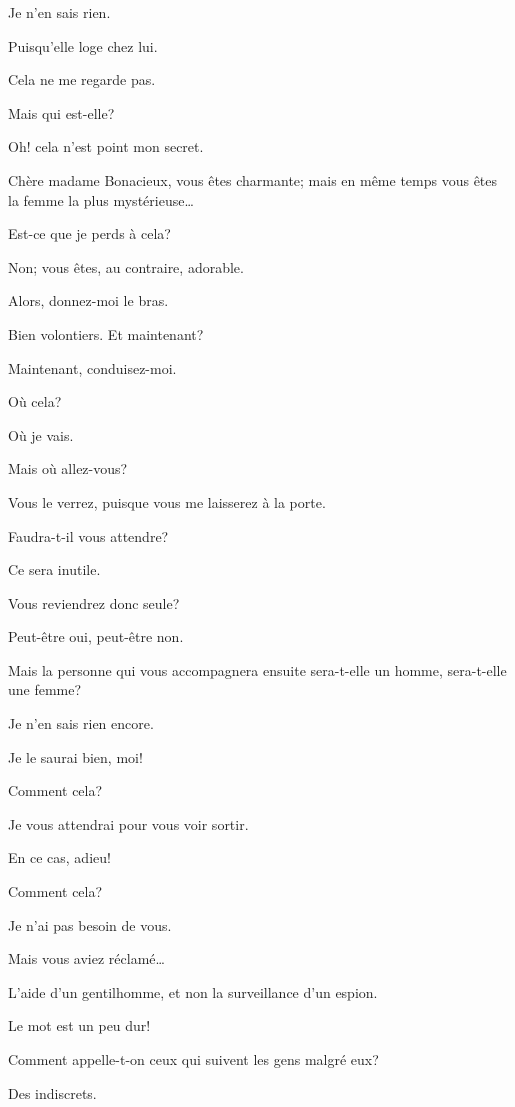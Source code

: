 \speak  Je n'en sais rien. 

\speak  Puisqu'elle loge chez lui. 

\speak  Cela ne me regarde pas. 

\speak  Mais qui est-elle? 

\speak  Oh! cela n'est point mon secret. 

\speak  Chère madame Bonacieux, vous êtes charmante; mais en même temps vous êtes la femme la plus mystérieuse\dots 

\speak  Est-ce que je perds à cela? 

\speak  Non; vous êtes, au contraire, adorable. 

\speak  Alors, donnez-moi le bras. 

\speak  Bien volontiers. Et maintenant? 

\speak  Maintenant, conduisez-moi. 

\speak  Où cela? 

\speak  Où je vais. 

\speak  Mais où allez-vous? 

\speak  Vous le verrez, puisque vous me laisserez à la porte. 

\speak  Faudra-t-il vous attendre? 

\speak  Ce sera inutile. 

\speak  Vous reviendrez donc seule? 

\speak  Peut-être oui, peut-être non. 

\speak  Mais la personne qui vous accompagnera ensuite sera-t-elle un homme, sera-t-elle une femme? 

\speak  Je n'en sais rien encore. 

\speak  Je le saurai bien, moi! 

\speak  Comment cela? 

\speak  Je vous attendrai pour vous voir sortir. 

\speak  En ce cas, adieu! 

\speak  Comment cela? 

\speak  Je n'ai pas besoin de vous. 

\speak  Mais vous aviez réclamé\dots 

\speak  L'aide d'un gentilhomme, et non la surveillance d'un espion. 

\speak  Le mot est un peu dur! 

\speak  Comment appelle-t-on ceux qui suivent les gens malgré eux? 

\speak  Des indiscrets. 


